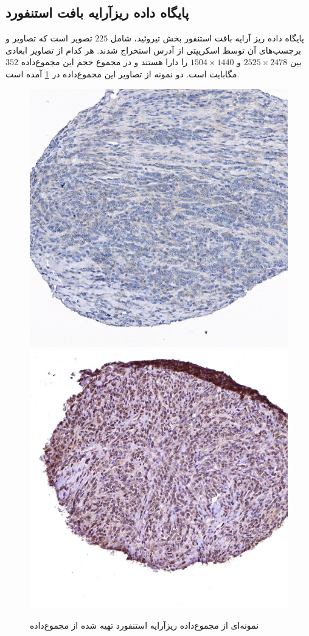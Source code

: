 \subsection{پایگاه داده ریزآرایه بافت استنفورد}\label{subsec:پایگاه-داده-ریزآرایه-بافت-استنفورد}
پایگاه داده ریز آرایه بافت استنفور\cite{marinelli2007stanford} بخش تیروئید، شامل $225$ تصویر است که تصاویر و برچسب‌های آن توسط اسکریپتی از آدرس \cite{stanfortissuemicroarray} استخراج شدند.
هر کدام از تصاویر ابعادی بین
$2525\times2478$
و
$1504\times1440$
را دارا هستند و در مجموع حجم این مجموع‌داده $352$ مگابایت است.
دو نمونه از تصاویر این مجموع‌داده در \ref{stanfordsample} آمده است.
\begin{figure}
	\begin{center}
		\includegraphics[width=0.48\linewidth]{figs/databases/C-TA-88-01.300.cd81_1_88_7_3_300_1469_29.jpeg}
		\includegraphics[width=0.48\linewidth]{figs/databases/C-TA-99-01.125.cyclind2_1_99_9_3_125_1365_31.jpeg}
	\end{center}
	\caption{نمونه‌ای از مجموع‌داده ریزآرایه استنفورد تهیه شده از مجموع‌داده \cite{marinelli2007stanford} }
	\label{stanfordsample}
\end{figure}
